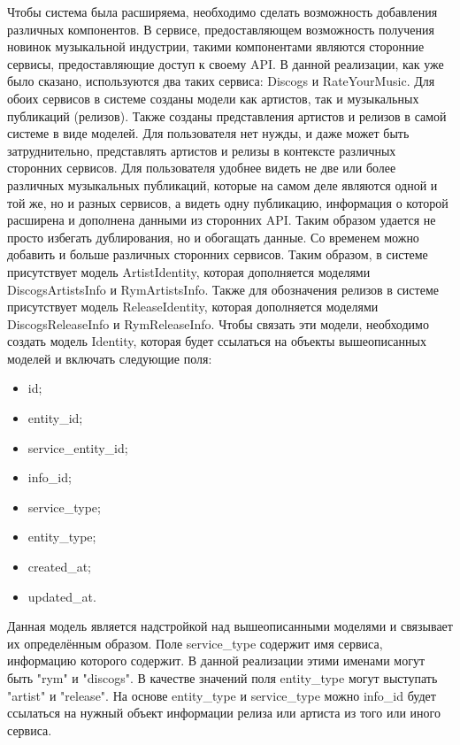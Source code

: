 Чтобы система была расширяема, необходимо сделать возможность добавления различных компонентов. В сервисе, предоставляющем возможность получения новинок музыкальной индустрии, такими компонентами являются сторонние сервисы, предоставляющие доступ к своему API. В данной реализации, как уже было сказано, используются два таких сервиса: Discogs и RateYourMusic. Для обоих сервисов в системе созданы модели как артистов, так и музыкальных публикаций (релизов). Также созданы представления артистов и релизов в самой системе в виде моделей. Для пользователя нет нужды, и даже может быть затруднительно, представлять артистов и релизы в контексте различных сторонних сервисов. Для пользователя удобнее видеть не две или более различных музыкальных публикаций, которые на самом деле являются одной и той же, но и разных сервисов, а видеть одну публикацию, информация о которой расширена и дополнена данными из сторонних API. Таким образом удается не просто избегать дублирования, но и обогащать данные. Со временем можно добавить и больше различных сторонних сервисов. Таким образом, в системе присутствует модель ArtistIdentity, которая дополняется моделями DiscogsArtistsInfo и RymArtistsInfo. Также для обозначения релизов в системе присутствует модель ReleaseIdentity, которая дополняется моделями DiscogsReleaseInfo и RymReleaseInfo. Чтобы связать эти модели, необходимо создать модель Identity, которая будет ссылаться на объекты вышеописанных моделей и включать следующие поля:

\begin{itemize}
  \item id;
  \item entity\_id;
  \item service\_entity\_id;
  \item info\_id;
  \item service\_type;
  \item entity\_type;
  \item created\_at;
  \item updated\_at.
\end{itemize}

Данная модель является надстройкой над вышеописанными моделями и связывает их определённым образом. Поле service\_type содержит имя сервиса, информацию которого содержит. В данной реализации этими именами могут быть "rym" и "discogs". В качестве значений поля entity\_type могут выступать "artist" и "release". На основе entity\_type и service\_type можно info\_id будет ссылаться на нужный объект информации релиза или артиста из того или иного сервиса.

